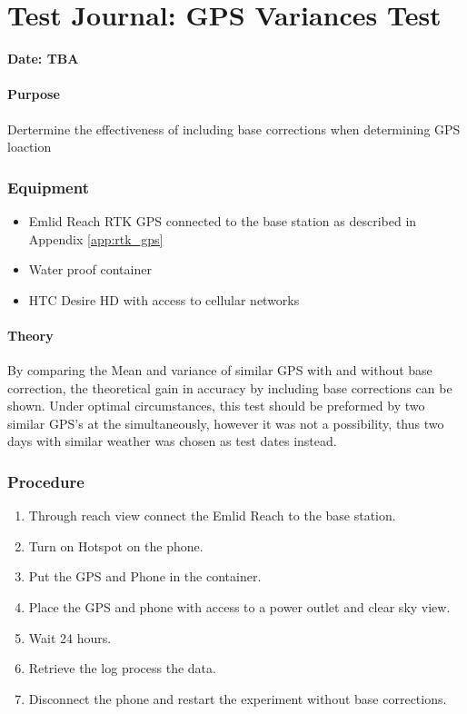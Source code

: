 \chapter{Test Journal: GPS Variances Test} \label{app:GPSImprovement}

\textbf{Date: TBA}

\subsubsection*{Purpose}
Dertermine the effectiveness of including base corrections when determining GPS loaction
\subsection*{Equipment}
\begin{itemize}
	\item Emlid Reach RTK GPS connected to the base station as described in Appendix \ref{app:rtk_gps}
    \item Water proof container
    \item HTC Desire HD with access to cellular networks
\end{itemize}

\subsubsection*{Theory}

By comparing the Mean and variance of similar GPS with and without base correction, the theoretical gain in accuracy by including base corrections can be shown.
Under optimal circumstances, this test should be preformed by two similar GPS's at the simultaneously, however it was not a possibility, thus two days with similar weather was chosen as test dates instead.

\subsection*{Procedure}

\begin{enumerate}
	\item Through reach view connect the Emlid Reach to the base station.
	\item Turn on Hotspot on the phone.
	\item Put the GPS and Phone in the container.
	\item Place the GPS and phone with access to a power outlet and clear sky view.
	\item Wait 24 hours.
	\item Retrieve the log process the data.
	\item Disconnect the phone and restart the experiment without base corrections.
	
\end{enumerate}

